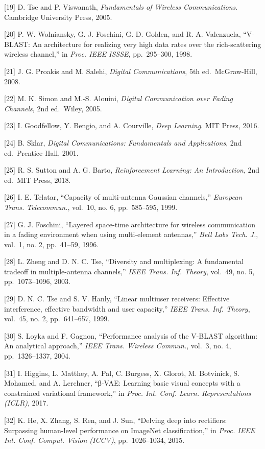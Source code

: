 \documentclass[
  english,
  12pt,
  12pt,
  a4paper,
  oneside]{report}
\begin{document}
{[}19{]} D. Tse and P. Viswanath, \emph{Fundamentals of Wireless Communications}. Cambridge University Press, 2005.

{[}20{]} P. W. Wolniansky, G. J. Foschini, G. D. Golden, and R. A. Valenzuela, ``V-BLAST: An architecture for realizing very high data rates over the rich-scattering wireless channel,'' in \emph{Proc. IEEE ISSSE}, pp.~295--300, 1998.

{[}21{]} J. G. Proakis and M. Salehi, \emph{Digital Communications}, 5th ed.~McGraw-Hill, 2008.

{[}22{]} M. K. Simon and M.-S. Alouini, \emph{Digital Communication over Fading Channels}, 2nd ed.~Wiley, 2005.

{[}23{]} I. Goodfellow, Y. Bengio, and A. Courville, \emph{Deep Learning}. MIT Press, 2016.

{[}24{]} B. Sklar, \emph{Digital Communications: Fundamentals and Applications}, 2nd ed.~Prentice Hall, 2001.

{[}25{]} R. S. Sutton and A. G. Barto, \emph{Reinforcement Learning: An Introduction}, 2nd ed.~MIT Press, 2018.

{[}26{]} I. E. Telatar, ``Capacity of multi-antenna Gaussian channels,'' \emph{European Trans. Telecommun.}, vol.~10, no. 6, pp.~585--595, 1999.

{[}27{]} G. J. Foschini, ``Layered space-time architecture for wireless communication in a fading environment when using multi-element antennas,'' \emph{Bell Labs Tech. J.}, vol.~1, no. 2, pp.~41--59, 1996.

{[}28{]} L. Zheng and D. N. C. Tse, ``Diversity and multiplexing: A fundamental tradeoff in multiple-antenna channels,'' \emph{IEEE Trans. Inf. Theory}, vol.~49, no. 5, pp.~1073--1096, 2003.

{[}29{]} D. N. C. Tse and S. V. Hanly, ``Linear multiuser receivers: Effective interference, effective bandwidth and user capacity,'' \emph{IEEE Trans. Inf. Theory}, vol.~45, no. 2, pp.~641--657, 1999.

{[}30{]} S. Loyka and F. Gagnon, ``Performance analysis of the V-BLAST algorithm: An analytical approach,'' \emph{IEEE Trans. Wireless Commun.}, vol.~3, no. 4, pp.~1326--1337, 2004.

{[}31{]} I. Higgins, L. Matthey, A. Pal, C. Burgess, X. Glorot, M. Botvinick, S. Mohamed, and A. Lerchner, ``β-VAE: Learning basic visual concepts with a constrained variational framework,'' in \emph{Proc. Int. Conf. Learn. Representations (ICLR)}, 2017.

{[}32{]} K. He, X. Zhang, S. Ren, and J. Sun, ``Delving deep into rectifiers: Surpassing human-level performance on ImageNet classification,'' in \emph{Proc. IEEE Int. Conf. Comput. Vision (ICCV)}, pp.~1026--1034, 2015.
\end{document}
